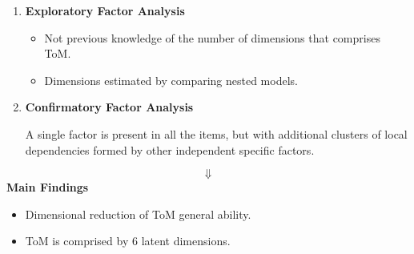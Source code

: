\documentclass[portrait,final,archD,fontscale=0.477]{baposter}
\begin{document}
\begin{poster}
{\begin{multicols}{2}
\begin{enumerate}
\item \textbf{Exploratory Factor Analysis}
\begin{itemize}
\item Not previous knowledge of the number of dimensions that comprises
ToM.
\item Dimensions estimated by comparing nested models.
\end{itemize}
\item \textbf{Confirmatory Factor Analysis}
\begin{tcolorbox}[title=Bifactor model]
A single factor is present in all the items, but with additional clusters
of local dependencies formed by other independent specific factors.
\end{tcolorbox}
\end{enumerate}

\vspace{-4em}
{\LARGE \[
\Downarrow
\]}
\centering
\textbf{Main Findings} 
\begin{itemize}
\item Dimensional reduction of ToM general ability.
\vspace{-0.5em}
\item ToM is comprised by 6 latent dimensions.
\end{itemize}

\end{multicols}

}

\end{poster}
\end{document}
